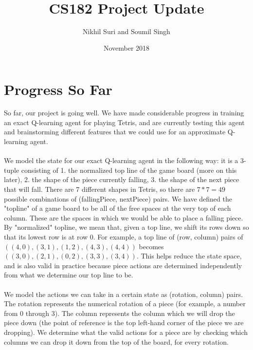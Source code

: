 \documentclass{article}
\title{CS182 Project Update}
\author{Nikhil Suri and Soumil Singh}
\date{November 2018}
\begin{document}
\maketitle

\section{Progress So Far}
So far, our project is going well. We have made considerable progress in training an exact Q-learning agent for playing Tetris, and are currently testing this agent and brainstorming different features that we could use for an approximate Q-learning agent.\\\\
We model the state for our exact Q-learning agent in the following way: it is a 3-tuple consisting of 1. the normalized top line of the game board (more on this later), 2. the shape of the piece currently falling, 3. the shape of the next piece that will fall. There are 7 different shapes in Tetris, so there are $7*7=49$ possible combinations of (fallingPiece, nextPiece) pairs. We have defined the "topline" of a game board to be all of the free spaces at the very top of each column. These are the spaces in which we would be able to place a falling piece. By "normalized" topline, we mean that, given a top line, we shift its rows down so that its lowest row is at row 0. For example, a top line of (row, column) pairs of $((4,0), (3,1), (1,2), (4,3), (4,4))$ becomes $((3,0), (2,1), (0,2), (3,3), (3,4))$. This helps reduce the state space, and is also valid in practice because piece actions are determined independently from what we determine our top line to be.\\\\
We model the actions we can take in a certain state as (rotation, column) pairs. The rotation represents the numerical rotation of a piece (for example, a number from 0 through 3). The column represents the column which we will drop the piece down (the point of reference is the top left-hand corner of the piece we are dropping). We determine what the valid actions for a piece are by checking which columns we can drop it down from the top of the board, for every rotation.\\\\
\end{document}
